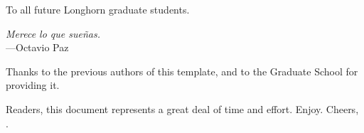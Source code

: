 

\copyrightpage  %

\commcertpage   %

\titlepage      %


\begin{dedication}		%
To all future Longhorn graduate students.
\end{dedication}

\begin{epigraph}		%
\begin{center}
    \textit{Merece lo que sueñas.}
    \\\hspace{4em}---Octavio Paz
\end{center}
\end{epigraph}

\begin{acknowledgments}		%
Thanks to the previous authors of this template, and to the Graduate School for providing it.
\end{acknowledgments}

\begin{preface}		%
Readers, this document represents a great deal of time and effort. Enjoy. Cheers, \theauthor.
\end{preface}

%
\utabstract

